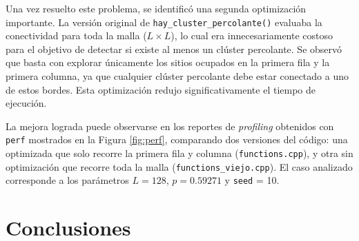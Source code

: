 \documentclass[%
 reprint,
 amsmath,amssymb,
 aps,
]{revtex4-2}
\begin{document}
Una vez resuelto este problema, se identificó una segunda optimización importante. La versión original de \texttt{hay\_cluster\_percolante()} evaluaba la conectividad para toda la malla (\( L \times L \)), lo cual era innecesariamente costoso para el objetivo de detectar si existe al menos un clúster percolante. Se observó que basta con explorar únicamente los sitios ocupados en la primera fila y la primera columna, ya que cualquier clúster percolante debe estar conectado a uno de estos bordes. Esta optimización redujo significativamente el tiempo de ejecución.

La mejora lograda puede observarse en los reportes de \textit{profiling} obtenidos con \texttt{perf} mostrados en la Figura \ref{fig:perf}, comparando dos versiones del código: una optimizada que solo recorre la primera fila y columna (\texttt{functions.cpp}), y otra sin optimización que recorre toda la malla (\texttt{functions\_viejo.cpp}). El caso analizado corresponde a los parámetros \( L = 128 \), \( p = 0.59271 \) y \texttt{seed} = 10.


\section{Conclusiones}


\end{document}
